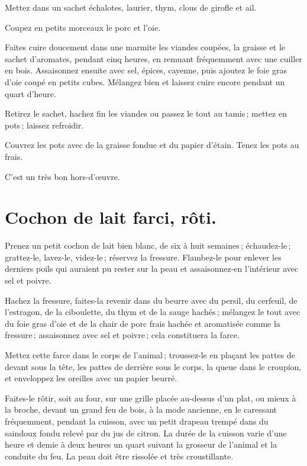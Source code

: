 Mettez dans un sachet échalotes, laurier, thym, clous de girofle et ail.

Coupez en petits morceaux le porc et l’oie.

Faites cuire doucement dans une marmite les viandes coupées, la graisse et le
sachet d'aromates, pendant cinq heures, en remuant fréquemment avec une
cuiller en bois. Assaisonnez ensuite avec sel, épices, cayenne, puis ajoutez le foie
gras d'oie coupé en petits cubes. Mélangez bien et laissez cuire encore pendant
un quart d'heure.

Retirez le sachet, hachez fin les viandes ou passez le tout au tamis ; mettez
en pots ; laissez refroidir.

Couvrez les pots avec de la graisse fondue et du papier d'étain. Tenez les pots
au frais.

C'est un très bon hors-d'œuvre.

\section*{\centering Cochon de lait farci, rôti.}
{}

Prenez un petit cochon de lait bien blanc, de six à huit semaines ;
échaudez-le ; grattez-le, lavez-le, videz-le ; réservez la fressure. Flambez-le
pour enlever les derniers poils qui auraient pu rester sur la peau et
assaisonnez-en l'intérieur avec sel et poivre.

Hachez la fressure, faites-la revenir dans du beurre avec du persil, du
cerfeuil, de l'estragon, de la ciboulette, du thym et de la sauge hachés ;
mélangez le tout avec du foie gras d'oie et de la chair de porc frais hachée et
aromatisée comme la fressure ; assaisonnez avec sel et poivre ; cela
constituera la farce.

Mettez cette farce dans le corps de l'animal ; troussez-le en plaçant les pattes de
devant sous la tête, les pattes de derrière sous le corps, la queue dans le croupion,
et enveloppez les oreilles avec un papier beurré.

Faites-le rôtir, soit au four, sur une grille placée au-dessus d'un plat, ou
mieux à la broche, devant un grand feu de bois, à la mode ancienne, en le
caressant fréquemment, pendant la cuisson, avec un petit drapeau trempé dans du
saindoux fondu relevé par du jus de citron. La durée de la cuisson varie d'une
heure et demie à deux heures un quart suivant la grosseur de l'animal et la
conduite du feu. La peau doit être rissolée et très croustillante.

